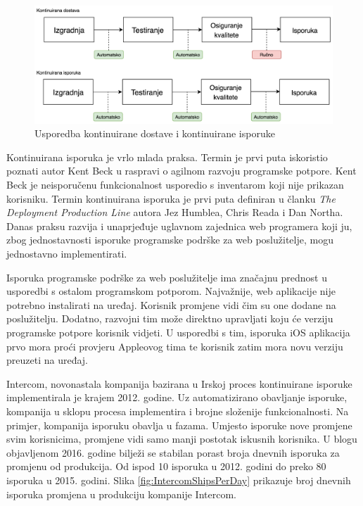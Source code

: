 \documentclass[times, utf8, diplomski, numeric]{fer}
\begin{document}
\begin{figure}
\centering
\includegraphics[scale=0.55]{CDDifferences}
\caption{Usporedba kontinuirane dostave i kontinuirane isporuke}
\label{fig:CDDifferences}
\end{figure}

Kontinuirana isporuka je vrlo mlada praksa. Termin je prvi puta iskoristio poznati autor Kent Beck u raspravi o agilnom razvoju programske potpore. Kent Beck je neisporučenu funkcionalnost usporedio s inventarom koji nije prikazan korisniku. Termin kontinuirana isporuka je prvi puta definiran u članku \textit{The Deployment Production Line} autora Jez Humblea, Chris Reada i Dan Northa\citep{mics:DPT}. Danas praksu razvija i unaprjeđuje uglavnom zajednica web programera koji ju, zbog jednostavnosti isporuke programske podrške za web poslužitelje, mogu jednostavno implementirati.

Isporuka programske podrške za web poslužitelje ima značajnu prednost u usporedbi s ostalom programskom potporom. Najvažnije, web aplikacije nije potrebno instalirati na uređaj. Korisnik promjene vidi čim su one dodane na poslužitelju. Dodatno, razvojni tim može direktno upravljati koju će verziju programske potpore korisnik vidjeti. U usporedbi s tim, isporuka iOS aplikacija prvo mora proći provjeru Appleovog tima te korisnik zatim mora novu verziju preuzeti na uređaj.

Intercom, novonastala kompanija bazirana u Irskoj proces kontinuirane isporuke implementirala je krajem 2012. godine. Uz automatizirano obavljanje isporuke, kompanija u sklopu procesa implementira i brojne složenije funkcionalnosti. Na primjer, kompanija isporuku obavlja u fazama. Umjesto isporuke nove promjene svim korisnicima, promjene vidi samo manji postotak iskusnih korisnika. U blogu objavljenom 2016. godine bilježi se stabilan porast broja dnevnih isporuka za promjenu od produkcija. Od ispod 10 isporuka u 2012. godini do preko 80 isporuka u 2015. godini. Slika \ref{fig:IntercomShipsPerDay} prikazuje broj dnevnih isporuka promjena u produkciju kompanije Intercom\citep{intercom:cd}.
\end{document}
